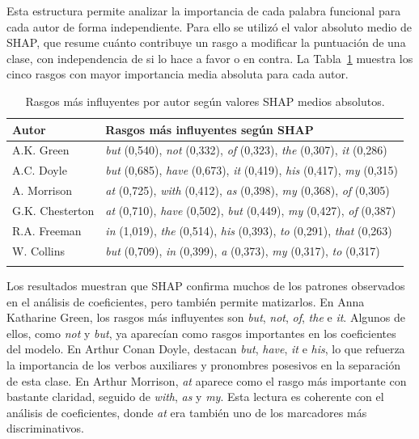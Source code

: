 \documentclass[IB]{TFUOC}%
\begin{document}
Esta estructura permite analizar la importancia de cada palabra funcional para cada autor de forma independiente. Para ello se utilizó el valor absoluto medio de SHAP, que resume cuánto contribuye un rasgo a modificar la puntuación de una clase, con independencia de si lo hace a favor o en contra. La Tabla~\ref{tab:shap-global-autores} muestra los cinco rasgos con mayor importancia media absoluta para cada autor.

\begin{longtable}{|p{3cm}|p{11cm}|}
\hline
\textbf{Autor} & \textbf{Rasgos más influyentes según SHAP} \\
\hline
A.K. Green &
\textit{but} (0,540), \textit{not} (0,332), \textit{of} (0,323), \textit{the} (0,307), \textit{it} (0,286) \\
\hline
A.C. Doyle &
\textit{but} (0,685), \textit{have} (0,673), \textit{it} (0,419), \textit{his} (0,417), \textit{my} (0,315) \\
\hline
A. Morrison &
\textit{at} (0,725), \textit{with} (0,412), \textit{as} (0,398), \textit{my} (0,368), \textit{of} (0,305) \\
\hline
G.K. Chesterton &
\textit{at} (0,710), \textit{have} (0,502), \textit{but} (0,449), \textit{my} (0,427), \textit{of} (0,387) \\
\hline
R.A. Freeman &
\textit{in} (1,019), \textit{the} (0,514), \textit{his} (0,393), \textit{to} (0,291), \textit{that} (0,263) \\
\hline
W. Collins &
\textit{but} (0,709), \textit{in} (0,399), \textit{a} (0,373), \textit{my} (0,317), \textit{to} (0,317) \\
\hline
\caption{Rasgos más influyentes por autor según valores SHAP medios absolutos.}
\label{tab:shap-global-autores}
\end{longtable}

Los resultados muestran que SHAP confirma muchos de los patrones observados en el análisis de coeficientes, pero también permite matizarlos. En Anna Katharine Green, los rasgos más influyentes son \textit{but}, \textit{not}, \textit{of}, \textit{the} e \textit{it}. Algunos de ellos, como \textit{not} y \textit{but}, ya aparecían como rasgos importantes en los coeficientes del modelo. En Arthur Conan Doyle, destacan \textit{but}, \textit{have}, \textit{it} e \textit{his}, lo que refuerza la importancia de los verbos auxiliares y pronombres posesivos en la separación de esta clase. En Arthur Morrison, \textit{at} aparece como el rasgo más importante con bastante claridad, seguido de \textit{with}, \textit{as} y \textit{my}. Esta lectura es coherente con el análisis de coeficientes, donde \textit{at} era también uno de los marcadores más discriminativos.
\end{document}
